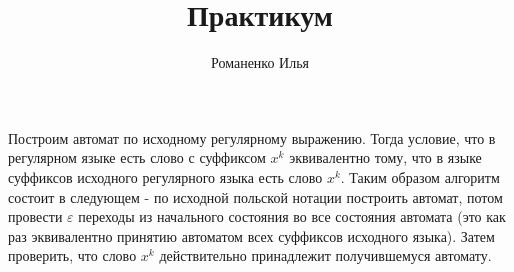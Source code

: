 \documentclass[10pt,a4paper]{article}
\author{Романенко Илья}
\title{ Практикум }
\date{}
\begin{document}
\maketitle

Построим автомат по исходному регулярному выражению. Тогда условие, что в регулярном языке есть слово с суффиксом $x^k$ эквивалентно тому, что в языке суффиксов исходного регулярного языка есть слово $x^k$. Таким образом алгоритм состоит в следующем - по исходной польской нотации построить автомат, потом провести $\varepsilon$ переходы из начального состояния во все состояния автомата (это как раз эквивалентно принятию автоматом всех суффиксов исходного языка). Затем проверить, что слово $x^k$ действительно принадлежит получившемуся автомату.
\end{document}

